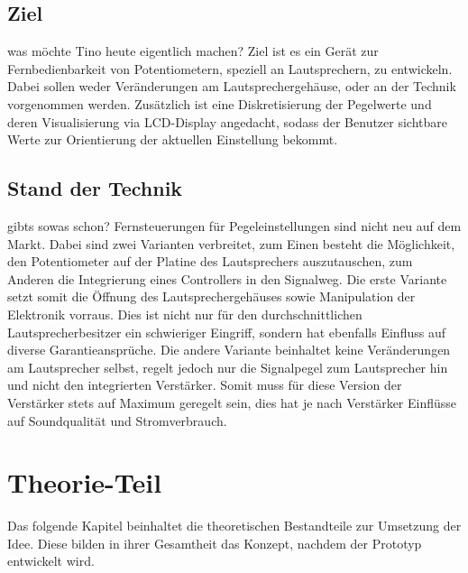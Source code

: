 \documentclass[11pt, titlepage, fleqn]{report}
\begin{document}
	\section{Ziel}
		was möchte Tino heute eigentlich machen?\newline
		Ziel ist es ein Gerät zur Fernbedienbarkeit von Potentiometern, speziell an Lautsprechern, zu entwickeln. Dabei sollen weder Veränderungen
		am Lautsprechergehäuse, oder an der Technik vorgenommen werden.
		Zusätzlich ist eine Diskretisierung der Pegelwerte und deren Visualisierung via LCD-Display angedacht, sodass der Benutzer sichtbare 
		Werte zur Orientierung der aktuellen Einstellung bekommt. 
	\section{Stand der Technik}	
		gibts sowas schon?\newline
		Fernsteuerungen für Pegeleinstellungen sind nicht neu auf dem Markt. Dabei sind zwei Varianten verbreitet, zum Einen besteht die Möglichkeit,
		den Potentiometer auf der Platine des Lautsprechers auszutauschen, zum Anderen die Integrierung eines Controllers in den Signalweg.
		Die erste Variante setzt somit die Öffnung des Lautsprechergehäuses sowie Manipulation der Elektronik vorraus. Dies ist nicht nur für den durchschnittlichen
		Lautsprecherbesitzer ein schwieriger Eingriff, sondern hat ebenfalls Einfluss auf diverse Garantieansprüche.\newline
		Die andere Variante beinhaltet keine Veränderungen am Lautsprecher selbst, regelt jedoch nur die Signalpegel zum Lautsprecher hin und nicht den 
		integrierten Verstärker. Somit muss für diese Version der Verstärker stets auf Maximum geregelt sein, dies hat je nach Verstärker Einflüsse
		auf Soundqualität und Stromverbrauch.
	\chapter{Theorie-Teil}
		Das folgende Kapitel beinhaltet die theoretischen Bestandteile zur Umsetzung der Idee. Diese bilden in ihrer Gesamtheit das Konzept,
		nachdem der Prototyp entwickelt wird.
\end{document}
